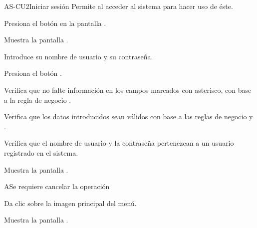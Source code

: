 \begin{UseCase}{AS-CU2}{Iniciar sesión}{
		Permite al  acceder al sistema para hacer uso 
		de éste.
	}
{\begin{Titemize}
			\Titem {}
		\end{Titemize}				
	}
	
	
	
	
	
\end{UseCase}



\begin{UCtrayectoria}
	
	\UCpaso [\UCactor] Presiona el botón  en la pantalla .
	
	\UCpaso Muestra la pantalla .
	
	\UCpaso [\UCactor] \label{AS-CU2:introducirDatos}Introduce su nombre de usuario y su contraseña.
	
	\UCpaso [\UCactor] Presiona el botón . 
	
	\UCpaso Verifica que no falte información en los campos marcados con asterisco, con base a la regla de negocio . 
	
	\UCpaso Verifica que los datos introducidos sean válidos con base a las reglas de negocio  y . 
	
	\UCpaso Verifica que el nombre de usuario y la contraseña pertenezcan a un usuario registrado en el sistema. 
	
	\UCpaso Muestra la pantalla .
	
\end{UCtrayectoria}



\begin{UCtrayectoriaA}{A}{Se requiere cancelar la operación}

	\UCpaso [\UCactor] Da clic sobre la imagen principal del menú.
	
	\UCpaso Muestra la pantalla .
\end{UCtrayectoriaA}
